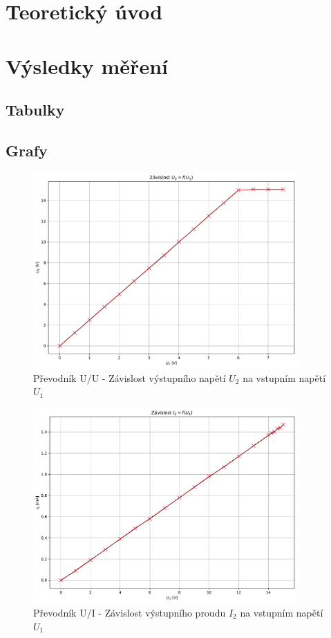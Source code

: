 \documentclass[a4paper, czech]{article}
\begin{document}
\section{Teoretický úvod}

\section{Výsledky měření}

\subsection{Tabulky}

\subsection{Grafy}

\begin{figure}[H]
    \centering
    \includegraphics[width=0.9\textwidth]{grafy/graf_prevodnik_UU.pdf}
    \caption{Převodník U/U - Závislost výstupního napětí $U_2$ na vstupním napětí $U_1$}
\end{figure}

\begin{figure}[H]
    \centering
    \includegraphics[width=0.9\textwidth]{grafy/graf_prevodnik_UI.pdf}
    \caption{Převodník U/I - Závislost výstupního proudu $I_2$ na vstupním napětí $U_1$}
\end{figure}
\end{document}
